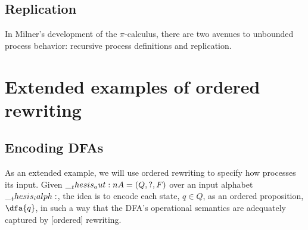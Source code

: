 




\subsection{Replication}

In Milner's development of the $\pi$-calculus, there are two avenues to unbounded process behavior: recursive process definitions and replication.


\section{Extended examples of ordered rewriting}

\subsection{Encoding \aclp*{DFA}}

As an extended example, we will use ordered rewriting to specify how  processes its input.
%
%
Given  $\__thesis_aut:n {A} = (Q, ?, F)$ over an input alphabet $\__thesis_ialph:$, the idea is to encode each state, $q \in Q$, as an ordered proposition, $\dfa{q}$, in such a way that the \ac{DFA}'s operational semantics are adequately captured by [ordered] rewriting.
%
%

